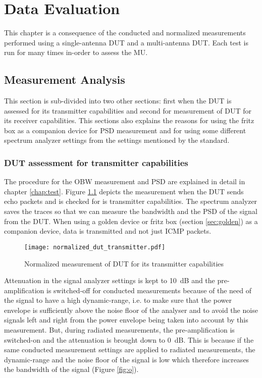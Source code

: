 \chapter{Data Evaluation}\label{chap:de}
This chapter is a consequence of the conducted and normalized measurements performed using a single-antenna \acs{DUT} and a multi-antenna \acs{DUT}. Each test is run for many times in-order to assess the \acf{MU}. 

\section{Measurement Analysis}
This section is sub-divided into two other sections: first when the \acs{DUT} is assessed for its transmitter capabilities and second for measurement of \acs{DUT} for its receiver capabilities. This sections also explains the reasons for using the fritz box as a companion device for \acs{PSD} measurement and for using some different spectrum analyzer settings from the settings mentioned by the standard.


\subsection{\acs{DUT} assessment for transmitter capabilities} 
The procedure for the \acf{OBW} measurement and \acf{PSD} are explained in detail in chapter \ref{chap:test}. Figure \ref{fig:nt} depicts the measurement when the \acs{DUT} sends echo packets and is checked for is transmitter capabilities. The spectrum analyzer saves the traces so that we can measure the bandwidth and the \acf{PSD} of the signal from the \acs{DUT}. When using a golden device or fritz box (section \ref{sec:golden}) as a companion device, data is transmitted and not just \acs{ICMP} packets.


\begin{figure}[H]
\centering
\texttt{[image: normalized\_dut\_transmitter.pdf]}
\vspace{-1.3cm}
\caption{Normalized measurement of \acs{DUT} for its transmitter capabilities}
\label{fig:nt} 
\end{figure}

Attenuation in the signal analyzer settings is kept to 10~dB and the pre-amplification is switched-off for conducted measurements because of the need of the signal to have a  high dynamic-range, i.e. to make sure that the power envelope is sufficiently above the noise floor of the analyser and to avoid the noise signals left and right from the power envelope being taken into account by this measurement. But, during radiated measurements, the pre-amplification is switched-on and the attenuation is brought down to 0~dB. This is because if the same conducted measurement settings are applied to radiated measurements, the dynamic-range and the noise floor of the signal is low which therefore increases the bandwidth of the signal (Figure \ref{fig:o}). 

